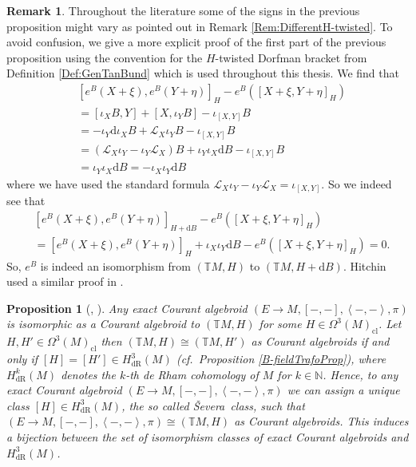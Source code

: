 \documentclass[12pt,a4paper]{article}
\theoremstyle{plain}
\newtheorem{proposition}[theorem]{Proposition}
\theoremstyle{definition}
\newtheorem{remark}[theorem]{Remark}
\newcommand{\N}{\mathbb{N}}
\newcommand{\scal}[2]{\left\langle #1,#2\right\rangle}
\newcommand{\Forms}[1]{\Omega^{#1}(M)}
\newcommand{\ClForms}[1]{\Forms{#1}_{\mathrm{cl}}}
\newcommand{\LieD}{\mathcal{L}}
\newcommand{\Severa}{\v{S}evera}
\renewcommand{\d}{\mathrm{d}}
\begin{document}
\begin{remark}
Throughout the literature some of the signs in the previous proposition might vary as pointed out in Remark \ref{Rem:DifferentH-twisted}. To avoid confusion, we give a more explicit proof of the first part of the previous proposition using the convention for the $H$-twisted Dorfman bracket from Definition \ref{Def:GenTanBund} which is used throughout this thesis. We find that
\begin{align*}
    &[e^B(X+\xi),e^B(Y+\eta)]_H-e^B([X+\xi,Y+\eta]_H)\\
    &=[\iota_XB,Y]+[X,\iota_YB]-\iota_{[X,Y]}B\\
    &=-\iota_Y\d\iota_XB+\LieD_X\iota_YB-\iota_{[X,Y]}B\\
    &=(\LieD_X\iota_Y-\iota_Y\LieD_X)B+\iota_Y\iota_X\d B-\iota_{[X,Y]}B\\
    &=\iota_Y\iota_X\d B=-\iota_X\iota_Y\d B
\end{align*}
where we have used the standard formula $\LieD_X\iota_Y-\iota_Y\LieD_X=\iota_{[X,Y]}$.
So we indeed see that
\begin{align*}
    &[e^B(X+\xi),e^B(Y+\eta)]_{H+\d B}-e^B([X+\xi,Y+\eta]_H)\\
    &=[e^B(X+\xi),e^B(Y+\eta)]_H+\iota_X\iota_Y\d B-e^B([X+\xi,Y+\eta]_H)=0.
\end{align*}
So, $e^B$ is indeed an isomorphism from $(\mathbb TM,H)$ to $(\mathbb TM,H+\d B)$. Hitchin used a similar proof in \cite[Proposition 1]{hitchin2010lecturesgeneralizedgeometry}.
\end{remark}

\begin{proposition}[{\cite[p.~5]{severa2001poissongeometry3formbackground}, \cite[p.~39]{gualtieri}}]
\label{Prop:SeveraClass}
Any exact Courant algebroid
$(E\to M,[-,-],\scal{-}{-},\pi)$ is isomorphic as a Courant algebroid to $(\mathbb TM, H)$ for some $H\in \ClForms{3}$. 
Let $H,H'\in \ClForms{3}$ then $(\mathbb TM,H)\cong (\mathbb TM,H')$ as Courant algebroids if and only if $[H]=[H']\in H_{\mathrm{dR}}^3(M)$ (cf.~Proposition \ref{B-fieldTrafoProp}), where $H_{\mathrm{dR}}^k(M)$ denotes the $k$-th de Rham cohomology of $M$ for $k\in \N$. 
Hence, to any exact Courant algebroid $(E\to M,[-,-],\scal{-}{-},\pi)$ we can assign a unique class $[H]\in H_\mathrm{dR}^3(M)$, the so called \textit{\Severa\ class}, such that $(E\to M,[-,-],\scal{-}{-},\pi)\cong (\mathbb TM, H)$ as Courant algebroids. This induces a bijection between the set of isomorphism classes of exact Courant algebroids and $H_\mathrm{dR}^3(M)$.
\end{proposition}
\end{document}
